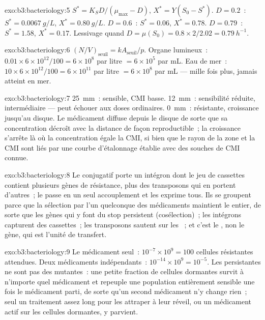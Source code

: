 \begin{solution}{exo:b3:bacteriology:5}
$S^{*} = K_{S}D/(\mu_{\max} - D)$, $X^{*} = Y(S_{0} - S^{*})$. $D = 0.2$~:
$S^{*} = \qty{0.0067}{g/L}$, $X^{*} = \qty{0.80}{g/L}$. $D = 0.6$~:
$S^{*} = 0.06$, $X^{*} = 0.78$. $D = 0.79$~: $S^{*} = 1.58$, $X^{*} = 0.17$.
Lessivage quand $D = \mu(S_{0}) = 0.8\times 2/2.02 = \qty{0.79}{h^{-1}}$.
\end{solution}

\begin{solution}{exo:b3:bacteriology:6}
$(N/V)_{\text{seuil}} = kA_{\text{seuil}}/p$. Organe lumineux~: $0.01\times
6\times 10^{12}/100 = 6\times 10^{8}$ par litre $= 6\times 10^{5}$ par
mL. Eau de mer~: $10\times 6\times 10^{12}/100 = 6\times 10^{11}$ par
litre $= 6\times 10^{8}$ par mL --- mille fois plus, jamais atteint en
mer.
\end{solution}

\begin{solution}{exo:b3:bacteriology:7}
\qty{25}{mm}~: sensible, CMI basse. \qty{12}{mm}~: sensibilité réduite,
intermédiaire --- peut échouer aux doses ordinaires. \qty{0}{mm}~:
résistante, croissance jusqu'au disque. Le médicament diffuse depuis le
disque de sorte que sa concentration décroît avec la distance de façon
reproductible~; la croissance s'arrête là où la concentration égale la
CMI, si bien que le rayon de la zone et la CMI sont liés par une courbe
d'étalonnage établie avec des souches de CMI connue.
\end{solution}

\begin{solution}{exo:b3:bacteriology:8}
Le  conjugatif porte un intégron dont le jeu de cassettes
contient plusieurs gènes de résistance, plus des transposons qui en
portent d'autres~; le  passe en un seul accouplement et les
exprime tous. Ils se groupent parce que la sélection par l'un
quelconque des médicaments maintient le  entier, de sorte que
les gènes qui y font du stop persistent (cosélection)~; les intégrons
capturent des cassettes~; les transposons sautent sur les ~; et
c'est le , non le gène, qui est l'unité de transfert.
\end{solution}

\begin{solution}{exo:b3:bacteriology:9}
Le médicament seul~: $10^{-7}\times 10^{9} = 100$ cellules résistantes
attendues. Deux médicaments indépendants~:
$10^{-14}\times 10^{9} = 10^{-5}$. Les persistantes ne sont pas des
mutantes~: une petite
fraction de cellules dormantes survit à n'importe quel médicament et
repeuple une population entièrement sensible une fois le médicament
parti, de sorte qu'un second médicament n'y change rien~; seul un
traitement assez long pour les attraper à leur réveil, ou un médicament
actif sur les cellules dormantes, y parvient.
\end{solution}

